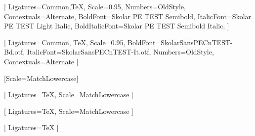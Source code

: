 %



\setmainfont{Skolar PE TEST Light}[
    Ligatures={Common,TeX},
    Scale=0.95, %
    Numbers={OldStyle},
    Contextuals={Alternate},
    BoldFont=Skolar PE TEST Semibold,
    ItalicFont=Skolar PE TEST Light Italic,
    BoldItalicFont=Skolar PE TEST Semibold Italic,
]

\setsansfont{SkolarSansPECnTEST-Rg.otf}[
    Ligatures={Common, TeX},
    Scale=0.95,
    BoldFont=SkolarSansPECnTEST-Bd.otf,
    ItalicFont=SkolarSansPECnTEST-It.otf,
    Numbers={OldStyle},
    Contextuals={Alternate}
]

\setmonofont{Iosevka}[Scale=MatchLowercase]

[
    Ligatures=TeX,
    Scale=MatchLowercase
]

\setmathfontface{}[
    Ligatures=TeX,
    Scale=MatchLowercase
]

\setoperatorfont\mathoper

\newfontface{}[
    Ligatures=TeX
]
